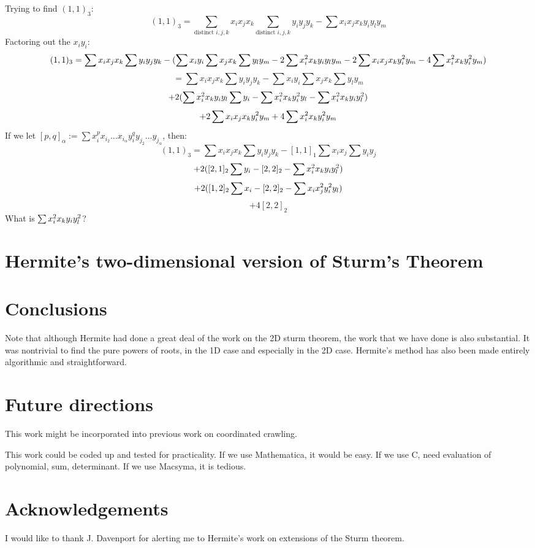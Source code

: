 Trying to find $(1,1)_{3}$:
\[ (1,1)_{3} = \sum_{\mbox{distinct }i,j,k} x_{i} x_{j} x_{k}
	       \sum_{\mbox{distinct }i,j,k} y_{i} y_{j} y_{k}
	     - \sum x_{i} x_{j} x_{k} y_{i} y_{l} y_{m}
\]
Factoring out the $x_{i}y_{i}$:
\[
\scriptsize{
(1,1)_{3}    =      \sum x_{i} x_{j} x_{k}   \sum y_{i} y_{j} y_{k}
	     - (\sum x_{i} y_{i} \sum x_{j} x_{k} \sum y_{l} y_{m}
		- 2 \sum x_{i}^{2} x_{k} y_{i} y_{l} y_{m}
		- 2 \sum x_{i}x_{j} x_{k} y_{i}^{2} y_{m}	
		- 4 \sum x_{i}^{2} x_{k} y_{i}^{2} y_{m})
}
\]
\[
	=      \sum x_{i} x_{j} x_{k} \sum y_{i} y_{j} y_{k}
	     - \sum x_{i} y_{i} \sum x_{j} x_{k} \sum y_{l} y_{m}
\]
\[
	     + 2 (\sum x_{i}^{2} x_{k} y_{i} y_{l} \sum y_{i}
		  - \sum x_{i}^{2} x_{k} y_{i}^{2} y_{l}
		  - \sum x_{i}^{2} x_{k} y_{i} y_{l}^{2})
\]
\[
	     + 2 \sum x_{i} x_{j} x_{k} y_{i}^{2} y_{m}	
	     + 4 \sum x_{i}^{2} x_{k} y_{i}^{2} y_{m}
\]
If we let $[p,q]_{\alpha} := \sum x_{i}^{p} x_{i_{2}} \ldots x_{i_{\alpha}} 
			    y_{i}^{q} y_{j_{2}} \ldots y_{j_{\alpha}}$, 
then:
\[ 
(1,1)_{3}
=      \sum x_{i} x_{j} x_{k} \sum y_{i} y_{j} y_{k}
     - [1,1]_{1} \sum x_{i} x_{j} \sum y_{i} y_{j}
\]
\[
     + 2 ([2,1]_{2} \sum y_{i}
     	- [2,2]_{2}
	- \sum x_{i}^{2} x_{k} y_{i} y_{l}^{2})
\]
\[
     + 2 ([1,2]_{2} \sum x_{i}
     	- [2,2]_{2}
	- \sum x_{i} x_{j}^{2} y_{i}^{2} y_{l})
\]
\[
     + 4 [2,2]_{2}
\]
What is $\sum x_{i}^{2} x_{k} y_{i} y_{l}^{2}$?
\QED

\section{Hermite's two-dimensional version of Sturm's Theorem}

\section{Conclusions}

Note that although Hermite had done a great deal of the work on the 2D sturm theorem,
the work that we have done is also substantial. 
It was nontrivial to find the pure powers of roots, in the 1D case and especially
in the 2D case.
Hermite's method has also been made entirely algorithmic and straightforward.

\section{Future directions}

This work might be incorporated into previous work on coordinated crawling.

This work could be coded up and tested for practicality.
If we use Mathematica, it would be easy.
If we use C, need evaluation of polynomial, sum, determinant.
If we use Macsyma, it is tedious.

\section{Acknowledgements}

I would like to thank J. Davenport for alerting me to Hermite's 
work on extensions of the Sturm theorem.


